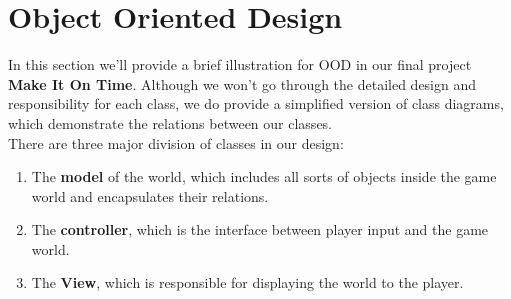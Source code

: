 \section{Object Oriented Design}
In this section we'll provide a brief illustration for OOD in our final project \textbf{Make It On Time}. Although we won't go through the detailed design and responsibility for each class, we do provide a simplified version of class diagrams, which demonstrate the relations between our classes.\\
There are three major division of classes in our design: 
\begin{enumerate}
\item The \textbf{model} of the world, which includes all sorts of objects inside the game world and encapsulates their relations.
\item The \textbf{controller}, which is the interface between player input and the game world.
\item The \textbf{View}, which is responsible for displaying the world to  the player.
\end{enumerate}
